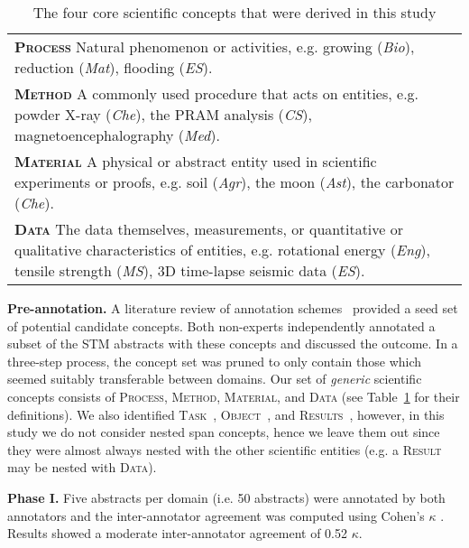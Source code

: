 \documentclass[runningheads]{llncs}
\begin{document}
\begin{table}[htb]
\small
\caption{The four core scientific concepts that were derived in this study}
\begin{tabular}{|p{12cm}|}
\textsc{\textbf{Process}} Natural phenomenon or activities, e.g. growing (\textit{Bio}), reduction (\textit{Mat}), flooding (\textit{ES}).                                          \\
\textsc{\textbf{Method}} A commonly used procedure that acts on entities, e.g. powder X-ray (\textit{Che}), the PRAM analysis (\textit{CS}), magnetoencephalography (\textit{Med}).                                  \\
\textsc{\textbf{Material}} A physical or abstract entity used in scientific experiments or proofs, e.g. soil (\textit{Agr}), the moon (\textit{Ast}), the carbonator (\textit{Che}).                                                   \\
\textsc{\textbf{Data}} The data themselves, measurements, or quantitative or qualitative characteristics of entities, e.g. rotational energy (\textit{Eng}), tensile strength (\textit{MS}), 3D time-lapse seismic data (\textit{ES}).
\end{tabular}
\label{table:0}
\end{table}


\textbf{Pre-annotation.} A literature review of annotation schemes~\cite{Liakata2010CorporaFT,augenstein2017semeval,liakata2012automatic,Constantin2016TheDC} provided a seed set of potential candidate concepts. 
Both non-experts independently annotated a subset of the STM abstracts with these concepts and discussed the outcome. In a three-step process, the concept set was pruned to only contain those which seemed suitably transferable between domains. Our set of \textit{generic} scientific concepts consists of \textsc{Process}, \textsc{Method}, \textsc{Material}, and \textsc{Data} (see Table~\ref{table:0} for their definitions). We also identified \textsc{Task}~\cite{augenstein2017semeval}, \textsc{Object}~\cite{liakata2012automatic}, and \textsc{Results}~\cite{Constantin2016TheDC}, however, in this study we do not consider nested span concepts, hence we leave them out since they were almost always nested with the other scientific entities (e.g. a \textsc{Result} may be nested with \textsc{Data}).


\textbf{Phase I.} Five abstracts per domain (i.e. 50 abstracts) were annotated by both annotators and the inter-annotator agreement was computed using Cohen's $\kappa$ \cite{cohen1960coefficient}.
Results showed a moderate inter-annotator agreement of 0.52 $\kappa$. 
\end{document}
